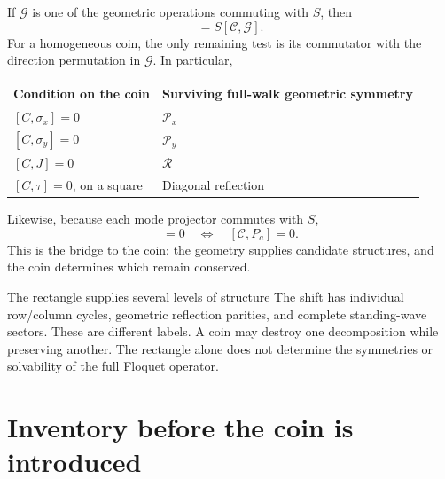 \documentclass[11pt,a4paper,oneside]{report}
\newcommand{\CC}{\mathcal C}
\numberwithin{equation}{chapter}
\begin{document}
If \(\mathcal G\) is one of the geometric operations commuting
with \(S\), then
\begin{equation}
[U,\mathcal G]=S[\CC,\mathcal G].
\label{eq:inherit}
\end{equation}
For a homogeneous coin, the only remaining test is its commutator
with the direction permutation in \(\mathcal G\). In particular,
\begin{center}
\begin{tabular}{@{}ll@{}}
\toprule
Condition on the coin&Surviving full-walk geometric symmetry\\
\midrule
\([C,\sigma_x]=0\)&\(\mathcal P_x\)\\
\([C,\sigma_y]=0\)&\(\mathcal P_y\)\\
\([C,J]=0\)&\(\mathcal R\)\\
\([C,\tau]=0\), on a square&Diagonal reflection\\
\bottomrule
\end{tabular}
\end{center}
Likewise, because each mode projector commutes with \(S\),
\begin{equation}
[U,P_a]=0\quad\Longleftrightarrow\quad[\CC,P_a]=0.
\end{equation}
This is the bridge to the coin: the geometry supplies candidate
structures, and the coin determines which remain conserved.

\begin{lesson}{The rectangle supplies several levels of structure}
The shift has individual row/column cycles, geometric reflection
parities, and complete standing-wave sectors. These are different
labels. A coin may destroy one decomposition while preserving another.
The rectangle alone does not determine the symmetries or solvability
of the full Floquet operator.
\end{lesson}


\section{Inventory before the coin is introduced}
\end{document}
